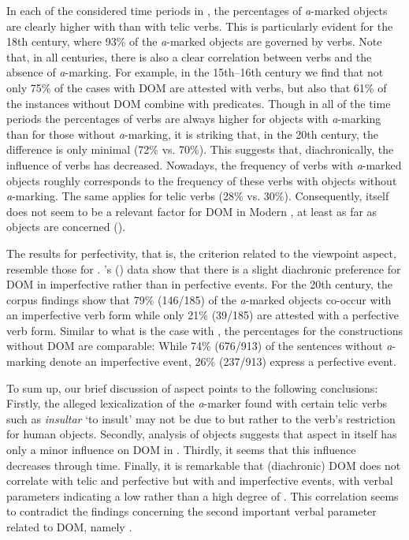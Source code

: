 \documentclass[output=paper]{LSP/langsci}
\begin{document}
In each of the considered time periods in , the percentages of \textit{a}-marked objects are clearly higher with  than with telic verbs. This is particularly evident for the 18th century, where 93\% of the \textit{a}-marked objects are governed by  verbs. Note that, in all centuries, there is also a clear correlation between  verbs and the absence of \textit{a}-marking. For example, in the 15th--16th century we find that not only 75\% of the cases with DOM are attested with  verbs, but also that 61\% of the instances without DOM combine with  predicates. Though in all of the time periods the percentages of  verbs are always higher for objects with \textit{a}-marking than for those without \textit{a}-marking, it is striking that, in the 20th century, the difference is only minimal (72\% vs. 70\%). This suggests that, diachronically, the influence of  verbs has decreased. Nowadays, the frequency of  verbs with \textit{a}-marked objects roughly corresponds to the frequency of these verbs with objects without \textit{a}-marking. The same applies for telic verbs (28\% vs. 30\%). Consequently,  itself does not seem to be a relevant factor for DOM in Modern , at least as far as  objects are concerned (\cf \citealt[345]{Barraza2008Marcacion}).

The results for perfectivity, that is, the criterion related to the viewpoint aspect, resemble those for . \citeauthor{Barraza2008Marcacion}'s (\citeyear[346--348]{Barraza2008Marcacion}) data show that there is a slight diachronic preference for DOM in imperfective rather than in perfective events. For the 20th century, the corpus findings show that 79\% (146/185) of the \textit{a}-marked objects co-occur with an imperfective verb form while only 21\% (39/185) are attested with a perfective verb form. Similar to what is the case with , the percentages for the constructions without DOM are comparable: While 74\% (676/913) of the sentences without \textit{a}-marking denote an imperfective event, 26\% (237/913) express a perfective event.

To sum up, our brief discussion of aspect points to the following conclusions: Firstly, the alleged lexicalization of the \textit{a}-marker found with certain telic verbs such as \textit{insultar} ‘to insult’ may not be due to  but rather to the verb’s restriction for human objects. Secondly,  analysis of  objects suggests that aspect in itself has only a minor influence on DOM in . Thirdly, it seems that this influence decreases through time. Finally, it is remarkable that (diachronic) DOM does not correlate with telic and perfective but with  and imperfective events, \ie with verbal parameters indicating a low rather than a high degree of . This correlation seems to contradict the findings concerning the second important verbal parameter related to DOM, namely .
\end{document}

